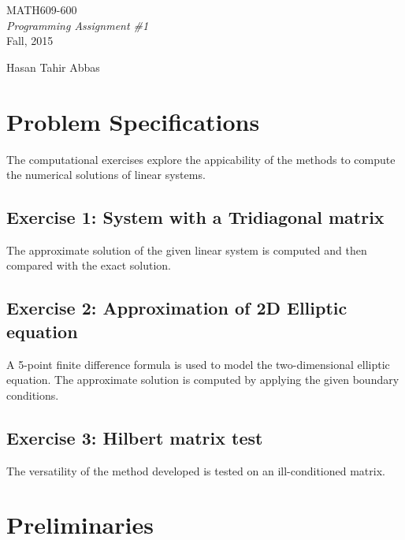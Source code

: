 \documentclass[11pt]{article}
\begin{document}
\begin{titlepage}

\vspace*{55mm}
\begin{center}
{\huge MATH609-600}\\[1cm]
{\em \huge Programming Assignment \#1}\\[70mm]
{\large Fall, 2015} \\[15mm]
\end{center}

\begin{flushright}
{\LARGE Hasan Tahir Abbas}
\end{flushright}

\vfill

\end{titlepage}

\newpage
\section{Problem Specifications}
The computational exercises explore the appicability of the methods to compute the numerical solutions of linear systems.


\subsection{Exercise 1: System with a Tridiagonal matrix}

The approximate solution of the given linear system is computed and then compared with the exact solution.

\subsection{Exercise 2: Approximation of 2D Elliptic equation}

A 5-point finite difference formula is used to model the two-dimensional elliptic equation. The approximate solution is computed by applying the given boundary conditions.

\subsection{Exercise 3: Hilbert matrix test}

 The versatility of the method developed is tested on an ill-conditioned matrix. 

\bigskip

\section{Preliminaries}
\end{document}
